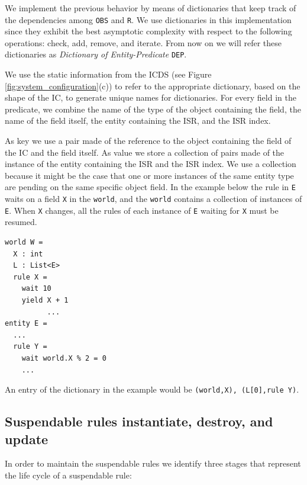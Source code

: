 We implement the previous behavior by means of dictionaries that keep track of the dependencies among \texttt{OBS} and \texttt{R}. We use dictionaries in this implementation since they exhibit the best asymptotic complexity with respect to the following operations: check, add, remove, and iterate. From now on we will refer these dictionaries as \emph{Dictionary of Entity-Predicate} \texttt{DEP}.

We use the static information from the ICDS (see Figure \ref{fig:system_configuration}(c)) to refer to the appropriate dictionary, based on the shape of the IC, to generate unique names for dictionaries. For every field in the predicate, we combine the name of the type of the object containing the field, the name of the field itself, the entity containing the ISR, and the ISR index.

As key we use a pair made of the reference to the object containing the field of the IC and the field itself. As value we store a collection of pairs made of the instance of the entity containing the ISR and the ISR index. We use a collection because it might be the case that one or more instances of the same entity type are pending on the same specific object field. In the example below the rule in \texttt{E} waits on a field \texttt{X} in the \texttt{world}, and the \texttt{world} contains a collection of instances of \texttt{E}. When \texttt{X} changes, all the rules of each instance of \texttt{E} waiting for \texttt{X} must be resumed.

\begin{lstlisting}
world W = 
  X : int
  L : List<E>
  rule X = 
    wait 10 
    yield X + 1
          ...
entity E = 
  ...
  rule Y = 
    wait world.X % 2 = 0
    ...
\end{lstlisting}

An entry of the dictionary in the example would be \texttt{(world,X), (L[0],rule Y)}.

\subsection{Suspendable rules instantiate, destroy, and update}

In order to maintain the suspendable rules we identify three stages that represent the life cycle of a suspendable rule:

